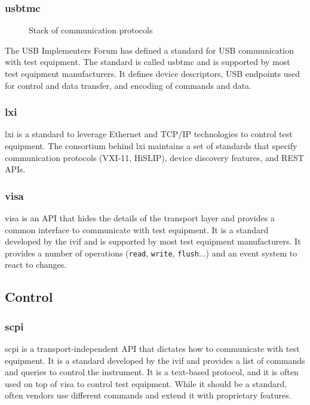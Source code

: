 \documentclass[a4paper,english,twoside,10pt]{article}
\begin{document}
\subsubsection{\texorpdfstring{\gls{usbtmc}}{USB-TMC}}\label{sec:usbtmc}
\begin{figure}
	\centering
	\caption{Stack of communication protocols}
\end{figure}
The USB Implementers Forum has defined a standard for USB communication with test equipment. The standard is called \gls{usbtmc} and is supported by most test equipment manufacturers. It defines device descriptors, USB endpoints used for control and data transfer, and encoding of commands and data.

\subsubsection{\texorpdfstring{\gls{lxi}}{LXI}}\label{sec:lxi}
\gls{lxi} is a standard to leverage Ethernet and TCP/IP technologies to control test equipment. The consortium behind \gls{lxi} maintains a set of standards that specify communication protocols (VXI-11, HiSLIP), device discovery features, and REST APIs.

\subsubsection{\texorpdfstring{\gls{visa}}{VISA}}
\gls{visa} is an API that hides the details of the transport layer and provides a common interface to communicate with test equipment. It is a standard developed by the \gls{ivif} and is supported by most test equipment manufacturers. It provides a number of operations (\texttt{read}, \texttt{write}, \texttt{flush}...) and an event system to react to changes.

\subsection{Control}
\subsubsection{\texorpdfstring{\gls{scpi}}{SCPI}}\label{sec:scpi}
\gls{scpi} is a transport-independent API that dictates how to communicate with test equipment. It is a standard developed by the \gls{ivif} and provides a list of commands and queries to control the instrument. It is a text-based protocol, and it is often used on top of \gls{visa} to control test equipment. While it should be a standard, often vendors use different commands and extend it with proprietary features.
\end{document}
